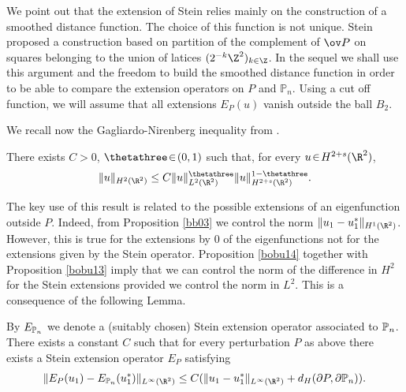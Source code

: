 \begin{rem}
We point out that the extension of Stein relies mainly on the construction of a smoothed distance function. The choice of this function is not unique. Stein proposed a construction based on partition of the complement of $\ov P$ on squares belonging to the union of latices $(2^{-k} \Z^2)_{k \in \Z}$. In the sequel we shall use this argument and the freedom to build the smoothed distance function in order to be able to compare the extension operators on $P$ and $\mathbb P_n$. Using a cut off function, we will assume that all extensions $E_P(u)$ vanish outside the ball $B_2$.
\end{rem}

We recall now the Gagliardo-Nirenberg inequality from \cite{BrMi18}.
\begin{propo}\label{bobu14}
There exists $C\!>\!0$, $\thetathree \!\in\! (0,1)$ such that, for every $u \!\in\! H^{2+s} (\R^2)$,
\[
\|u\|_{H^{2} (\R^2)}\le C \| u\|_{L^2(\R^2)}^\thetathree \|u\|_{H^{2+s} (\R^2)}^{1-\thetathree}.
\]
\end{propo}
The key use of this result is related to the possible extensions of an eigenfunction outside $P$. Indeed, from Proposition \ref{bb03} we control the norm $\|u_1-u_1^*\|_{H^1(\R^2)} $. However, this is true for the extensions by $0$ of the eigenfunctions not for the extensions given by the Stein operator. Proposition \ref{bobu14} together with Proposition \ref{bobu13} imply that we can control the norm of the difference in $H^2$ for the Stein extensions provided we control the norm in $L^2$. This is a consequence of the following Lemma.
\begin{lemma}\label{bobu15}
By $E_{\Bbb P_n}$ we denote a (suitably chosen) Stein extension operator associated to $\Bbb P_n$. There exists a constant $C$ such that for every perturbation $P$ as above there exists a Stein extension operator $E_P$ satisfying
\begin{equation}\label{bobu21}
\|E_P(u_1)-E_{\Bbb P_n}(u_1^*)\|_{L^\infty(\R^2)}\le C (\|u_1-u_1^*\|_{L^\infty(\R^2)}+ d_H(\partial P, \partial \Bbb P_n)).
\end{equation}
\end{lemma}
